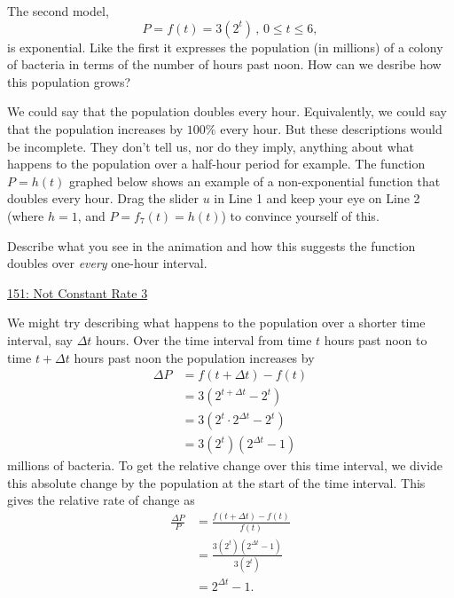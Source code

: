 \documentclass{ximera}
\begin{document}

The second model,
\[
   P =f(t) =3 (2^t) \, , \, 0\leq t \leq 6 ,
\]
is exponential. Like the first it expresses the population (in millions) of a colony of bacteria in terms of the number of hours past noon. How can we desribe how this population grows?

We could say that the population doubles every hour. Equivalently, we could say that the population increases by $100\%$ every hour. But these descriptions would be incomplete. They don't tell us, nor do they imply, anything about what happens to the population over a half-hour period for example. The function $P=h(t)$ graphed below shows an example of a non-exponential function that doubles every hour. Drag the slider $u$ in Line 1 and keep your eye on Line 2 (where $h=1$, and $P=f_7(t) = h(t)$) to convince yourself of this.

Describe what you see in the animation and how this suggests the function doubles over \emph{every} one-hour interval.

\begin{freeResponse}
\end{freeResponse}

\href{https://www.desmos.com/calculator/zapwlt6qju}{151: Not Constant Rate 3} 

 
\begin{onlineOnly}
    \begin{center}
\end{center}
\end{onlineOnly}


We might try describing what happens to the population over a shorter time interval, say $\Delta t$ hours. Over the time interval from time $t$ hours past noon to time $t+\Delta t$ hours past noon the population increases by 
\begin{align*}
  \Delta P &=  f(t + \Delta t) - f(t)  \\ 
                               &=  3 (2^{t+\Delta t} - 2^t) \\
                               &=  3 (2^t \cdot 2^{\Delta t} - 2^t) \\
                               &=  3 (2^t) (2^{\Delta t} - 1) 
\end{align*}
millions of bacteria. To get the relative change over this time interval, we divide this absolute change by the population at the start of the time interval. This gives the relative rate of change as
\begin{align*}
   \frac{\Delta P}{P} &=  \frac{f(t + \Delta t) - f(t)}{f(t)}  \\ 
                              &= \frac{3 (2^t) (2^{\Delta t} - 1)}{3 (2^t)} \\
                              &= 2^{\Delta t} - 1.
\end{align*}
\end{document}
